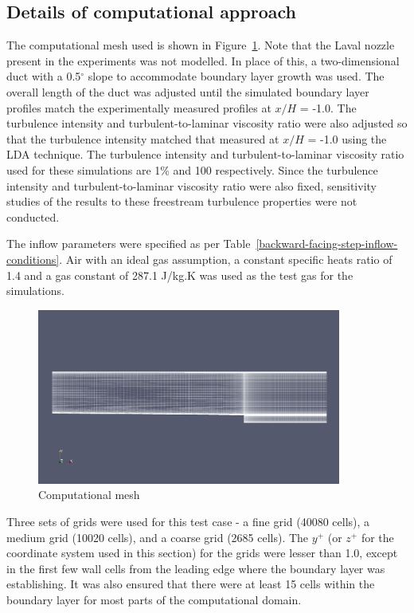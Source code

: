 \subsection{Details of computational approach}
%
The computational mesh used is shown in Figure~\ref{backward-facing-step-computational-mesh}.
Note that the Laval nozzle present in the experiments was not modelled. In place of this,
a two-dimensional duct with a 0.5$^{\circ}$ slope to accommodate boundary layer growth
was used. The overall length of the duct was adjusted until the simulated boundary
layer profiles match the experimentally measured profiles at $x/H$ = -1.0. The
turbulence intensity and turbulent-to-laminar viscosity ratio were also adjusted
so that the turbulence intensity matched that measured at $x/H$ = -1.0 using
the LDA technique. The turbulence intensity and turbulent-to-laminar viscosity ratio used
for these simulations are 1\% and 100 respectively. Since the turbulence intensity and 
turbulent-to-laminar viscosity ratio were also fixed, sensitivity studies of the results 
to these freestream turbulence properties were not conducted.

The inflow parameters were specified as per Table~\ref{backward-facing-step-inflow-conditions}. 
Air with an ideal gas assumption, a constant specific heats ratio of 1.4 and a 
gas constant of 287.1 J/kg.K was used as the test gas for the simulations.
\begin{figure}[h]
 \begin{center}
  \includegraphics[width=10cm]{./chap4-backward-facing-step/figs/grid.png}
 \end{center}
 \caption{Computational mesh}
 \label{backward-facing-step-computational-mesh}
\end{figure}
Three sets of grids were used for this test case - a fine grid (40080 cells), 
a medium grid (10020 cells), and a coarse grid (2685 cells). The $y^+$ (or $z^+$ 
for the coordinate system used in this section) for the grids were lesser than 1.0, 
except in the first few wall cells from the leading edge where the boundary layer 
was establishing. It was also ensured that there were at least 15 cells within the
boundary layer for most parts of the computational domain.

